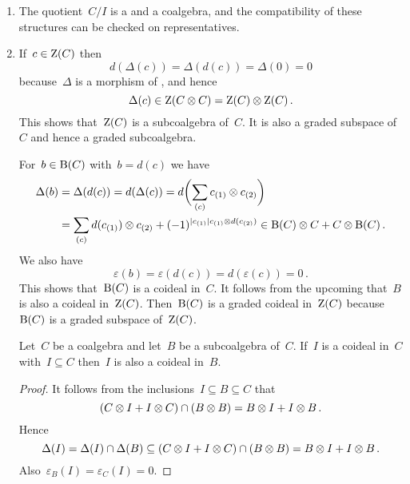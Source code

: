 \begin{enumerate}[start=3]
  \item
    The quotient~$C/I$ is a {\dgv} and a coalgebra, and the compatibility of these structures can be checked on representatives.
  \item
    If~$c \in \operatorname{Z}(C)$ then
    \[
      d(\Delta(c))
      =
      \Delta(d(c))
      =
      \Delta(0)
      =
      0
    \]
    because~$\Delta$ is a morphism of {\dgvs}, and hence
    \[
      \Delta(c)
      \in
      \operatorname{Z}(C \otimes C)
      =
      \operatorname{Z}(C) \otimes \operatorname{Z}(C) \,.
    \]
    This shows that~$\operatorname{Z}(C)$ is a subcoalgebra of~$C$.
    It is also a graded subspace of~$C$ and hence a graded subcoalgebra.

    For~$b \in \operatorname{B}(C)$ with~$b = d(c)$ we have
    \begin{align*}
      \Delta(b)
      &=
      \Delta(d(c))
      =
      d(\Delta(c))
      =
      d\biggl( \sum_{(c)} c_{(1)} \otimes c_{(2)} \biggr)
      \\
      &=
      \sum_{(c)}
      d(c_{(1)}) \otimes c_{(2)}
      +
      (-1)^{\lvert c_{(1)}\rvert c_{(1)} \otimes d(c_{(2)})}
      \in
      \operatorname{B}(C) \otimes C + C \otimes \operatorname{B}(C) \,.
    \end{align*}
    We also have
    \[
      \varepsilon(b)
      =
      \varepsilon(d(c))
      =
      d(\varepsilon(c))
      =
      0 \,.
    \]
    This shows that~$\operatorname{B}(C)$ is a coideal in~$C$.
    It follows from the upcoming  that~$B$ is also a coideal in~$\operatorname{Z}(C)$.
    Then~$\operatorname{B}(C)$ is a graded coideal in~$\operatorname{Z}(C)$ because~$\operatorname{B}(C)$ is a graded subspace of~$\operatorname{Z}(C)$.

    \begin{lemma}
      \label{restriction of coideals}
      Let~$C$ be a coalgebra and let~$B$ be a subcoalgebra of~$C$.
      If~$I$ is a coideal in~$C$ with~$I \subseteq C$ then~$I$ is also a coideal in~$B$.
    \end{lemma}

    \begin{proof}
      It follows from the inclusions~$I \subseteq B \subseteq C$ that
      \[
        (C \otimes I + I \otimes C) \cap (B \otimes B)
        =
        B \otimes I + I \otimes B \,.
      \]
      Hence
      \[
        \Delta(I)
        =
        \Delta(I) \cap \Delta(B)
        \subseteq
        (C \otimes I + I \otimes C) \cap (B \otimes B)
        =
        B \otimes I + I \otimes B \,.
      \]
      Also~$\varepsilon_B(I) = \varepsilon_C(I) = 0$.
    \end{proof}
\end{enumerate}



